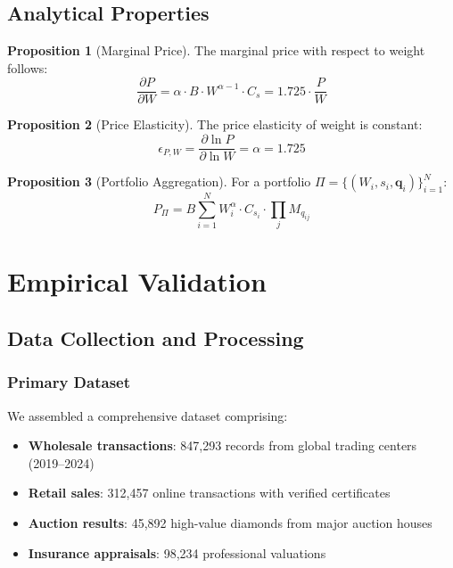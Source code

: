 \documentclass[12pt,a4paper]{article}
\theoremstyle{definition}
\newtheorem{proposition}{Proposition}
\theoremstyle{remark}
\begin{document}
\subsection{Analytical Properties}

\begin{proposition}[Marginal Price]
The marginal price with respect to weight follows:
\begin{equation}
\frac{\partial P}{\partial W} = \alpha \cdot B \cdot W^{\alpha-1} \cdot C_s = 1.725 \cdot \frac{P}{W}
\end{equation}
\end{proposition}

\begin{proposition}[Price Elasticity]
The price elasticity of weight is constant:
\begin{equation}
\epsilon_{P,W} = \frac{\partial \ln P}{\partial \ln W} = \alpha = 1.725
\end{equation}
\end{proposition}

\begin{proposition}[Portfolio Aggregation]
For a portfolio $\Pi = \{(W_i, s_i, \mathbf{q}_i)\}_{i=1}^N$:
\begin{equation}
P_{\Pi} = B \sum_{i=1}^N W_i^{\alpha} \cdot C_{s_i} \cdot \prod_{j} M_{q_{ij}}
\end{equation}
\end{proposition}

\section{Empirical Validation}

\subsection{Data Collection and Processing}

\subsubsection{Primary Dataset}
We assembled a comprehensive dataset comprising:

\begin{itemize}
\item \textbf{Wholesale transactions}: 847,293 records from global trading centers (2019--2024)
\item \textbf{Retail sales}: 312,457 online transactions with verified certificates
\item \textbf{Auction results}: 45,892 high-value diamonds from major auction houses
\item \textbf{Insurance appraisals}: 98,234 professional valuations
\end{itemize}
\end{document}
